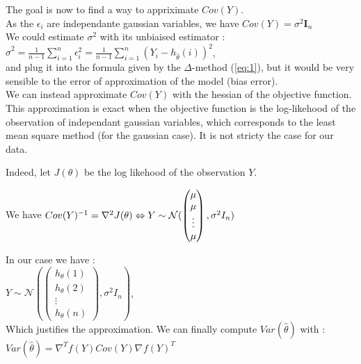 \documentclass{article}
\begin{document}
The goal is now to find a way to appriximate $Cov(Y)$.\\



As the $\epsilon_i$ are independante gaussian variables, we have $Cov(Y) = \sigma ^2 \mathbf{I}_n$\\

We could estimate $\sigma^2$ with its unbiaised estimator : \\

$\hat{\sigma}^2 = \frac{1}{n-1} \sum_{i=1}^{n} \epsilon_i^2  = \frac{1}{n-1} \sum_{i=1}^{n} (Y_i - h_{\hat{\theta}}(i))^2$, \\

and plug it into the formula given by the $\Delta$-method (\ref*{eq:1}), but it would be very sensible to the error of approximation of the model (bias error). \\

We can instead approximate $Cov(Y)$ with the hessian of the objective function. 
This approximation is exact when the objective function is the log-likehood of the observation of independant gaussian variables, which corresponds to the least mean square method (for the gaussian case). 
It is not stricty the case for our data. \

Indeed, let $J(\theta)$ be the log likehood of the observation $Y$. 

We have $Cov(Y)^{-1} = \nabla ^2 J(\theta) \Leftrightarrow  Y \sim \mathcal{N}(
    \begin{pmatrix}
        \mu \\
        \mu \\
        \vdots \\
        \mu
    \end{pmatrix} , \sigma ^2 I_n )\\[0.2cm]
     $  

In our case we have :\\[0.3cm]
 $Y \sim \mathcal{N}(
    \begin{pmatrix}
        h_{\theta}(1) \\
        h_{\theta}(2) \\
        \vdots \\
        h_{\theta}(n)
    \end{pmatrix} , \sigma ^2 I_n )$,\\[0.2cm]
     

Which justifies the approximation. We can finally compute $Var(\hat{\theta})$ with : $Var(\hat{\theta}) = \nabla_{} ^T f(Y) Cov(Y) \nabla_{} f(Y)^T$
\end{document}
